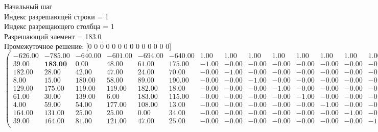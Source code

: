 \documentclass{article}
\begin{document}
\begin{flushleft}
    
    Начальный шаг \\
Индекс разрешающей строки = 1\\
Индекс разрещающего столбца = 1\\
Разрешающий элемент = 183.0\\
Промежуточное решение:
 [0 0 0 0 0 0 0 0 0 0 0 0 0 0]
\begin{equation*}
\begin{pmatrix}
-626.00 & -785.00 & -640.00 & -601.00 & -694.00 & -640.00 &  1.00 &  1.00 &  1.00 &  1.00 &  1.00 &  1.00 &  1.00 &  1.00 & 0.00 & 0.00 & 0.00 & 0.00 & 0.00 & 0.00 & 0.00 & 0.00 & -8.00 \\
   39.00 &  \textbf{183.00} &    0.00 &   48.00 &   61.00 &  175.00 & -1.00 & -0.00 & -0.00 & -0.00 & -0.00 & -0.00 & -0.00 & -0.00 & 1.00 & 0.00 & 0.00 & 0.00 & 0.00 & 0.00 & 0.00 & 0.00 &  1.00 \\
  182.00 &   28.00 &   42.00 &   47.00 &   24.00 &   70.00 & -0.00 & -1.00 & -0.00 & -0.00 & -0.00 & -0.00 & -0.00 & -0.00 & 0.00 & 1.00 & 0.00 & 0.00 & 0.00 & 0.00 & 0.00 & 0.00 &  1.00 \\
    8.00 &   15.00 &  180.00 &   58.00 &   89.00 &  190.00 & -0.00 & -0.00 & -1.00 & -0.00 & -0.00 & -0.00 & -0.00 & -0.00 & 0.00 & 0.00 & 1.00 & 0.00 & 0.00 & 0.00 & 0.00 & 0.00 &  1.00 \\
  129.00 &  175.00 &  119.00 &  119.00 &  182.00 &   18.00 & -0.00 & -0.00 & -0.00 & -1.00 & -0.00 & -0.00 & -0.00 & -0.00 & 0.00 & 0.00 & 0.00 & 1.00 & 0.00 & 0.00 & 0.00 & 0.00 &  1.00 \\
   61.00 &   30.00 &  139.00 &    6.00 &  183.00 &  115.00 & -0.00 & -0.00 & -0.00 & -0.00 & -1.00 & -0.00 & -0.00 & -0.00 & 0.00 & 0.00 & 0.00 & 0.00 & 1.00 & 0.00 & 0.00 & 0.00 &  1.00 \\
    4.00 &   59.00 &   54.00 &  177.00 &  108.00 &   13.00 & -0.00 & -0.00 & -0.00 & -0.00 & -0.00 & -1.00 & -0.00 & -0.00 & 0.00 & 0.00 & 0.00 & 0.00 & 0.00 & 1.00 & 0.00 & 0.00 &  1.00 \\
  164.00 &  131.00 &   25.00 &   25.00 &    0.00 &   34.00 & -0.00 & -0.00 & -0.00 & -0.00 & -0.00 & -0.00 & -1.00 & -0.00 & 0.00 & 0.00 & 0.00 & 0.00 & 0.00 & 0.00 & 1.00 & 0.00 &  1.00 \\
   39.00 &  164.00 &   81.00 &  121.00 &   47.00 &   25.00 & -0.00 & -0.00 & -0.00 & -0.00 & -0.00 & -0.00 & -0.00 & -1.00 & 0.00 & 0.00 & 0.00 & 0.00 & 0.00 & 0.00 & 0.00 & 1.00 &  1.00 \\
\end{pmatrix}
\end{equation*}
\end{flushleft}
\end{document}
